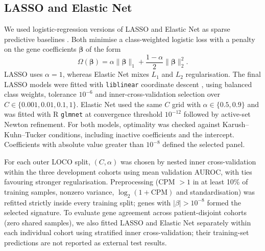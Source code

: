 \subsection{LASSO and Elastic Net}
\label{sec:sparse_methods}
We used logistic-regression versions of LASSO and Elastic Net as sparse predictive baselines \cite{tibshirani1996lasso,zou2005elastic}. Both minimise a class-weighted logistic loss with a penalty on the gene coefficients $\boldsymbol{\beta}$ of the form
\begin{equation}
\Omega(\boldsymbol{\beta})=\alpha\lVert\boldsymbol{\beta}\rVert_1+
\frac{1-\alpha}{2}\lVert\boldsymbol{\beta}\rVert_2^2.
\label{eq:sparse_penalty}
\end{equation}
LASSO uses $\alpha=1$, whereas Elastic Net mixes $L_1$ and $L_2$ regularisation. The final LASSO models were fitted with \texttt{liblinear} coordinate descent \cite{fan2008liblinear}, using balanced class weights, tolerance $10^{-6}$ and inner-cross-validation selection over $C\in\{0.001,0.01,0.1,1\}$. Elastic Net used the same $C$ grid with $\alpha\in\{0.5,0.9\}$ and was fitted with R \texttt{glmnet} \cite{friedman2010glmnet} at convergence threshold $10^{-12}$ followed by active-set Newton refinement. For both models, optimality was checked against Karush--Kuhn--Tucker conditions, including inactive coefficients and the intercept. Coefficients with absolute value greater than $10^{-8}$ defined the selected panel.

For each outer LOCO split, $(C,\alpha)$ was chosen by nested inner cross-validation within the three development cohorts using mean validation AUROC, with ties favouring stronger regularisation. Preprocessing (CPM $>1$ in at least 10\% of training samples, nonzero variance, $\log_2(1+\mathrm{CPM})$ and standardisation) was refitted strictly inside every training split; genes with $|\beta|>10^{-8}$ formed the selected signature. To evaluate gene agreement across patient-disjoint cohorts (zero shared samples), we also fitted LASSO and Elastic Net separately within each individual cohort using stratified inner cross-validation; their training-set predictions are not reported as external test results.
